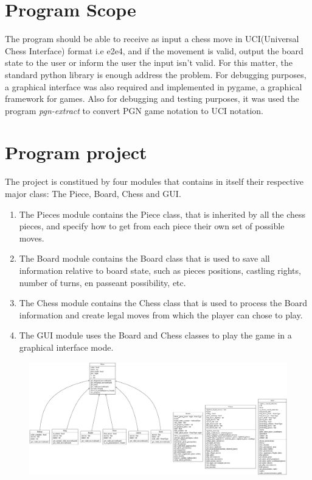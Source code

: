 \documentclass[10pt]{article}
\author{}
\title{}
\date{}
\begin{document}
\maketitle

\section{Program Scope}

The program should be able to receive as input a chess move in UCI(Universal
Chess Interface) format i.e
e2e4, and if the movement is valid, output the board state to the user or inform
the user the input isn't valid. For this matter, the standard python library is
enough address the problem. For debugging purposes, a graphical interface was
also required and implemented in pygame, a graphical framework for games. Also
for debugging and testing purposes, it was used the program
\textit{pgn-extract} to convert PGN game notation to UCI notation.


\section{Program project}

The project is constitued by four modules that contains in itself their
respective major class: The Piece, Board, Chess and GUI.
\begin{enumerate}
    \item The Pieces module contains the Piece class, that is inherited by all
        the chess pieces, and specify how to get from each piece their own set
        of possible moves.
        \item The Board module contains the Board class that is used to save all
            information relative to board state, such as pieces positions,
            castling rights, number of turns, en passeant possibility, etc.
        \item The Chess module contains the Chess class that is used to process
            the Board information and create legal moves from which the player
            can chose to play.
        \item The GUI module uses the Board and Chess classes to play the game
            in a graphical interface mode.
\end{enumerate}


\begin{figure}[H]
    \includegraphics[scale=0.2]{fig/classes_Chess.png}
\end{figure}
\end{document}
